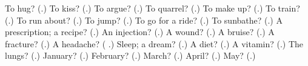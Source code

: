 \begin{tcolorbox}[breakable,colback=teal!4,colframe=teal!35!black,title={Before you move on}]
To hug? (\textbf{}.) To kiss? (\textbf{}.) To argue? (\textbf{}.) To quarrel? (\textbf{}.) To make up? (\textbf{}.) To train? (\textbf{}.) To run about? (\textbf{}.) To jump? (\textbf{}.) To go for a ride? (\textbf{}.) To sunbathe? (\textbf{}.) A prescription; a recipe? (\textbf{}.) An injection? (\textbf{}.) A wound? (\textbf{}.) A bruise? (\textbf{}.) A fracture? (\textbf{}.) A headache? (\textbf{ }.) Sleep; a dream? (\textbf{}.) A diet? (\textbf{}.) A vitamin? (\textbf{}.) The lungs? (\textbf{}.) January? (\textbf{}.) February? (\textbf{}.) March? (\textbf{}.) April? (\textbf{}.) May? (\textbf{}.)
\end{tcolorbox}
